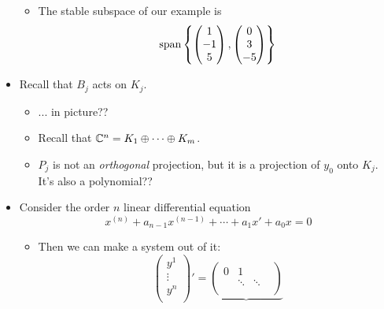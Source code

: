 \documentclass[../notes.tex]{subfiles}
\begin{document}
\begin{itemize}
\begin{itemize}
\begin{itemize}
        \end{itemize}
        \item The stable subspace of our example is
        \begin{equation*}
            \operatorname{span}\left\{
                \begin{pmatrix}
                    1\\
                    -1\\
                    5\\
                \end{pmatrix},
                \begin{pmatrix}
                    0\\
                    3\\
                    -5\\
                \end{pmatrix}
            \right\}
        \end{equation*}
    \end{itemize}
    \item Recall that $B_j$ acts on $K_j$.
    \begin{itemize}
        \item ... in picture??
        \item Recall that $\mathbb{C}^n=K_1\oplus\cdots\oplus K_m$.
        \item $P_j$ is not an \emph{orthogonal} projection, but it is a projection of $y_0$ onto $K_j$. It's also a polynomial??
    \end{itemize}
    \item Consider the order $n$ linear differential equation
    \begin{equation*}
        x^{(n)}+a_{n-1}x^{(n-1)}+\cdots+a_1x'+a_0x = 0
    \end{equation*}
    \begin{itemize}
        \item Then we can make a system out of it:
        \begin{equation*}
            \begin{pmatrix}
                y^1\\
                \vdots\\
                y^n\\
            \end{pmatrix}'
            = \underbrace{
                \begin{pmatrix}
                    0 & 1 &  & \\
                     & \ddots & \ddots & \\

\end{pmatrix}}
\end{equation*}
\end{itemize}
\end{itemize}
\end{document}
